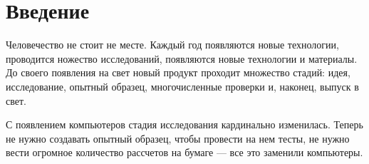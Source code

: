 \chapter*{Введение}


Человечество не стоит не месте. Каждый год появляются новые технологии, проводится ножество исследований, появляются новые технологии и материалы. До своего появления на свет новый продукт проходит множество стадий: идея, исследование, опытный образец, многочисленные проверки и, наконец, выпуск в свет.

С появлением компьютеров стадия исследования кардинально изменилась. Теперь не нужно создавать опытный образец, чтобы провести на нем тесты, не нужно вести огромное количество рассчетов на бумаге --- все это заменили компьютеры.